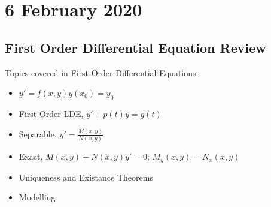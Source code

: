 \documentclass[diffeq.tex]{subfiles}
\begin{document}
\chapter{6 February 2020}
\section{First Order Differential Equation Review}
Topics covered in First Order Differential Equations.
\begin{itemize}
    \item $y' = f(x, y)$\quad$y(x_{0}) = y_{0}$
    \item First Order LDE, $y' + p(t)y = g(t)$
    \item Separable, $y' = \frac{M(x, y)}{N(x, y)}$
    \item Exact, $M(x, y) + N(x, y)y' = 0$; $M_{y}(x, y) = N_{x}(x, y)$
    \item Uniqueness and Existance Theorems
    \item Modelling
\end{itemize}
\end{document}
